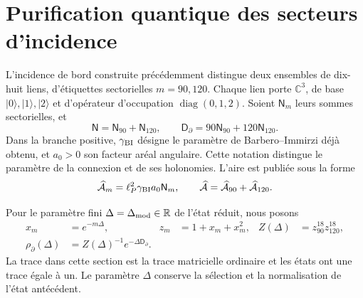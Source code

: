\section{Purification quantique des secteurs d'incidence}
\label{x_reciprocidad:vii:subsec:purificacion-sectorial}

L'incidence de bord construite précédemment distingue deux ensembles
de dix-huit liens, d'étiquettes sectorielles \(m=90,120\). Chaque lien
porte \(\mathbb C^3\), de base \(|0\rangle,|1\rangle,|2\rangle\)
et d'opérateur d'occupation \(\operatorname{diag}(0,1,2)\). Soient
\(\mathsf N_m\) leurs sommes sectorielles, et
\begin{equation}
 \mathsf N=\mathsf N_{90}+\mathsf N_{120},\qquad
 \mathsf D_\partial=90\mathsf N_{90}+120\mathsf N_{120}.
 \label{x_reciprocidad:vii:eq:ocupaciones-sectoriales}
\end{equation}
Dans la branche positive, \(\gamma_{\rm BI}\) désigne le paramètre de
Barbero--Immirzi déjà obtenu, et \(a_0>0\) son facteur aréal angulaire.
Cette notation distingue le paramètre de la connexion et de ses holonomies.
L'aire est publiée sous la forme
\begin{equation}
 \widehat{\mathcal A}_m=\ell_P^2\gamma_{\rm BI}a_0\mathsf N_m,
 \qquad
 \widehat{\mathcal A}=\widehat{\mathcal A}_{90}
                         +\widehat{\mathcal A}_{120}.
 \label{x_reciprocidad:vii:eq:area-sectores}
\end{equation}

Pour le paramètre fini \(\Delta=\Delta_{\rm mod}\in\mathbb R\) de l'état réduit, nous posons
\begin{align}
 x_m&=e^{-m\Delta},& z_m&=1+x_m+x_m^2,&
 Z(\Delta)&=z_{90}^{18}z_{120}^{18},\\
 \rho_\partial(\Delta)&=Z(\Delta)^{-1}e^{-\Delta\mathsf D_\partial}.
 \label{x_reciprocidad:vii:eq:estado-sectorial}
\end{align}
La trace dans cette section est la trace matricielle ordinaire et les états ont une trace égale à un. Le paramètre \(\Delta\) conserve la sélection et la normalisation de l'état antécédent.

